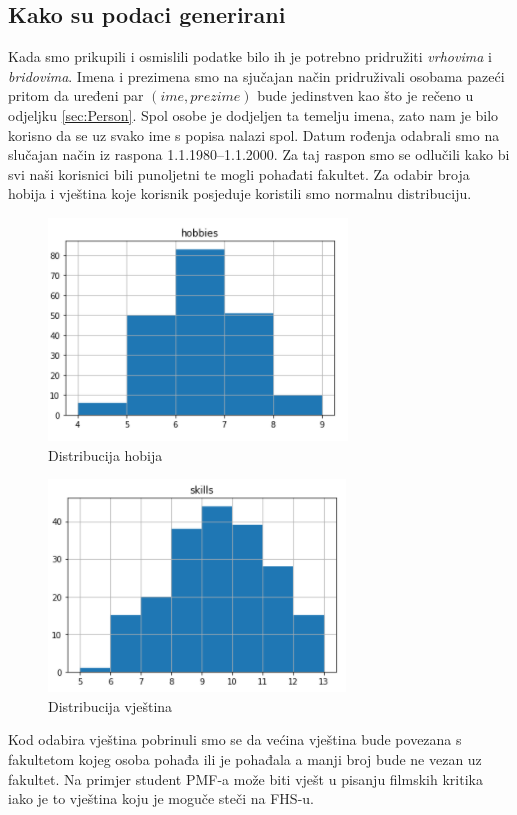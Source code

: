 \documentclass[titlepage, 12pt]{scrartcl}
\begin{document}
\subsection{Kako su podaci generirani}
Kada smo prikupili i osmislili podatke bilo ih je potrebno pridružiti \emph{vrhovima} i \emph{bridovima}.
Imena i prezimena smo na sjučajan način pridruživali osobama pazeći pritom da uređeni par $(ime,prezime)$ bude jedinstven kao što je rečeno u odjeljku \ref{sec:Person}. Spol osobe je dodjeljen ta temelju imena, zato nam je bilo korisno da se uz svako ime s popisa nalazi spol.
Datum rođenja odabrali smo na slučajan način iz raspona 1.1.1980--1.1.2000. Za taj raspon smo se odlučili kako bi svi naši korisnici bili punoljetni te mogli pohađati fakultet.
Za odabir broja hobija i vještina koje korisnik posjeduje koristili smo normalnu distribuciju.
\begin{figure}
    \centering
    \includegraphics{slike/Hobbies_distribution.png}
    \caption{Distribucija hobija}
    \label{fig:hobbies}
\end{figure}
\begin{figure}
    \centering
    \includegraphics{slike/Skills_distribution.png}
    \caption{Distribucija vještina}
    \label{fig:skills}
\end{figure}
Kod odabira vještina pobrinuli smo se da većina vještina bude povezana s fakultetom kojeg osoba pohađa ili je pohađala a manji broj bude ne vezan uz fakultet. Na primjer student PMF-a može biti vješt u pisanju filmskih kritika iako je to vještina koju je moguče steči na FHS-u.
\end{document}
